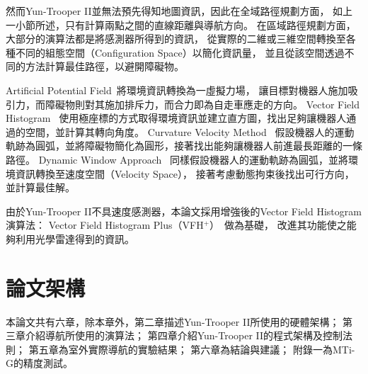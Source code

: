 然而Yun-Trooper II並無法預先得知地圖資訊，因此在全域路徑規劃方面，
如上一小節所述，只有計算兩點之間的直線距離與導航方向。
在區域路徑規劃方面，大部分的演算法都是將感測器所得到的資訊，
從實際的二維或三維空間轉換至各種不同的組態空間（Configuration Space）以簡化資訊量，
並且從該空間透過不同的方法計算最佳路徑，以避開障礙物。

Artificial Potential Field~\cite{Khatib:1985:APF}將環境資訊轉換為一虛擬力場，
讓目標對機器人施加吸引力，而障礙物則對其施加排斥力，而合力即為自走車應走的方向。
Vector Field Histogram~\cite{Borenstein:1991:VFH}
使用極座標的方式取得環境資訊並建立直方圖，找出足夠讓機器人通過的空間，並計算其轉向角度。
Curvature Velocity Method~\cite{Simmons:1996:CVM}
假設機器人的運動軌跡為圓弧，並將障礙物簡化為圓形，接著找出能夠讓機器人前進最長距離的一條路徑。
Dynamic Window Approach~\cite{Thrun:1997:DW}
同樣假設機器人的運動軌跡為圓弧，並將環境資訊轉換至速度空間（Velocity Space），
接著考慮動態拘束後找出可行方向，並計算最佳解。

由於Yun-Trooper II不具速度感測器，本論文採用增強後的Vector Field Histogram演算法：
Vector Field Histogram Plus（VFH$^+$）~\cite{Ulrich:1998:VFHPlus}做為基礎，
改進其功能使之能夠利用光學雷達得到的資訊。

\section{論文架構}
本論文共有六章，除本章外，第二章描述Yun-Trooper II所使用的硬體架構；
第三章介紹導航所使用的演算法；
第四章介紹Yun-Trooper II的程式架構及控制法則；
第五章為室外實際導航的實驗結果；
第六章為結論與建議；
附錄一為MTi-G的精度測試。

